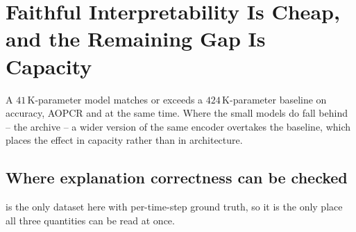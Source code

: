 %

\section{Faithful Interpretability Is Cheap, and the Remaining Gap Is Capacity}
\label{sec:cheap}

\begin{finding}
\label{find:cheap}
A $41$\,K-parameter model matches or exceeds a $424$\,K-parameter \millet{} baseline on accuracy,
AOPCR and \ndcg{} at the same time. Where the small models do fall behind -- the \ucr{} archive -- a
wider version of the same encoder overtakes the baseline, which places the effect in capacity rather
than in architecture.
\end{finding}

\subsection{Where explanation correctness can be checked}
\label{sec:cheap:web}

\webtraffic{} is the only dataset here with per-time-step ground truth, so it is the only place all
three quantities can be read at once.

